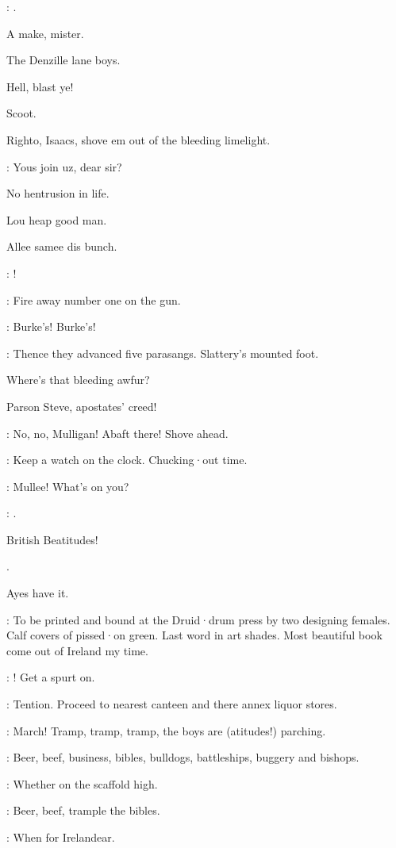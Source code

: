 \mulligan:
.

A make,
mister.

The Denzille lane boys.

Hell,
blast ye!

Scoot.

Righto,
Isaacs,
shove em out of the bleeding limelight.

\punch:
Yous join uz,
dear sir?

No hentrusion in life.

Lou heap good man.

Allee samee dis bunch.

\bannon:
!

\lenehan:
Fire away number one on the gun.

\All:
Burke's!
Burke's!

:
Thence they advanced five parasangs.
Slattery's mounted foot.

Where's that bleeding awfur?

Parson Steve,
apostates' creed!

\lynch:
No,
no,
Mulligan!
Abaft there!
Shove ahead.

\lenehan:
Keep a watch on the clock.
Chucking·out time.

\madden:
Mullee!
What's on you?

\mulligan:
.

British Beatitudes!

.

Ayes have it.

\stephen:
To be printed and bound at the Druid·drum press by two designing females.
Calf covers of pissed·on green.
Last word in art shades.
Most beautiful book come out of Ireland my time.

\crotthers:
!
Get a spurt on.

\lenehan:
Tention.
Proceed to nearest canteen and there annex liquor stores.

\punch:
March!
Tramp,
tramp,
tramp,
the boys are
(atitudes!)
parching.

\madden:
Beer,
beef,
business,
bibles,
bulldogs,
battleships,
buggery and bishops.%

\dixon:
Whether on the scaffold high.

\madden:
Beer,
beef,
trample the bibles.

\dixon:
When for Irelandear.

